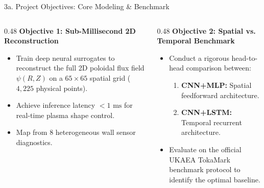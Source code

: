 \documentclass[aspectratio=169, 10pt]{beamer}
\begin{document}
\begin{frame}{3a. Project Objectives: Core Modeling \& Benchmark}
  \begin{columns}[T]
    \begin{column}{0.48\textwidth}
      \textbf{\color{NavyBlue} Objective 1: Sub-Millisecond 2D Reconstruction}
      \begin{itemize}
        \item Train deep neural surrogates to reconstruct the full 2D poloidal flux field $\psi(R,Z)$ on a $65 \times 65$ spatial grid ($4,225$ physical points).
        \item Achieve inference latency $<1\text{ ms}$ for real-time plasma shape control.
        \item Map from 8 heterogeneous wall sensor diagnostics.
      \end{itemize}
    \end{column}

    \begin{column}{0.48\textwidth}
      \textbf{\color{NavyBlue} Objective 2: Spatial vs. Temporal Benchmark}
      \begin{itemize}
        \item Conduct a rigorous head-to-head comparison between:
          \begin{enumerate}
            \item \textbf{CNN+MLP:} Spatial feedforward architecture.
            \item \textbf{CNN+LSTM:} Temporal recurrent architecture.
          \end{enumerate}
        \item Evaluate on the official UKAEA TokaMark benchmark protocol to identify the optimal baseline.
      \end{itemize}
    \end{column}
  \end{columns}
\end{frame}
\end{document}
